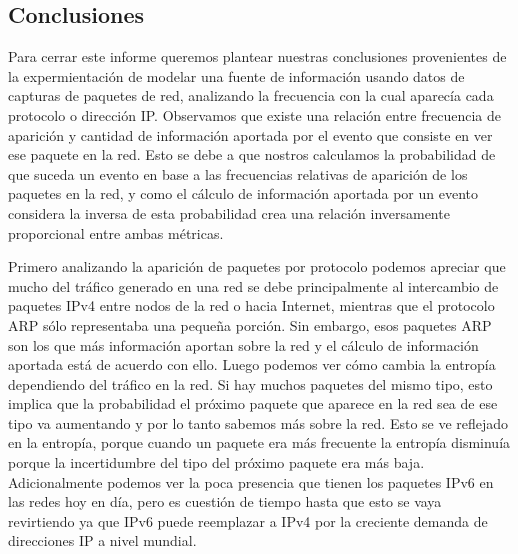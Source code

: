 \subsection{Conclusiones}

Para cerrar este informe queremos plantear nuestras conclusiones provenientes de la expermientación de modelar una fuente de información usando datos de capturas de paquetes de red, analizando la frecuencia con la cual aparecía cada protocolo o dirección IP. Observamos que existe una relación entre frecuencia de aparición y cantidad de información aportada por el evento que consiste en ver ese paquete en la red. Esto se debe a que nostros calculamos la probabilidad de que suceda un evento en base a las frecuencias relativas de aparición de los paquetes en la red, y como el cálculo de información aportada por un evento considera la inversa de esta probabilidad crea una relación inversamente proporcional entre ambas métricas.

Primero analizando la aparición de paquetes por protocolo podemos apreciar que mucho del tráfico generado en una red se debe principalmente al intercambio de paquetes IPv4 entre nodos de la red o hacia Internet, mientras que el protocolo ARP sólo representaba una pequeña porción. Sin embargo, esos paquetes ARP son los que más información aportan sobre la red y el cálculo de información aportada está de acuerdo con ello. Luego podemos ver cómo cambia la entropía dependiendo del tráfico en la red. Si hay muchos paquetes del mismo tipo, esto implica que la probabilidad el próximo paquete que aparece en la red sea de ese tipo va aumentando y por lo tanto sabemos más sobre la red. Esto se ve reflejado en la entropía, porque cuando un paquete era más frecuente la entropía disminuía porque la incertidumbre del tipo del próximo paquete era más baja. Adicionalmente podemos ver la poca presencia que tienen los paquetes IPv6 en las redes hoy en día, pero es cuestión de tiempo hasta que esto se vaya revirtiendo ya que IPv6 puede reemplazar a IPv4 por la creciente demanda de direcciones IP a nivel mundial.

